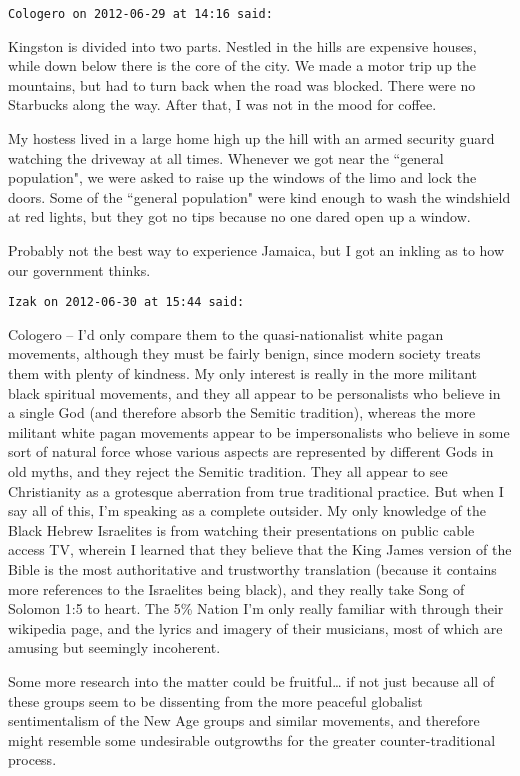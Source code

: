 \begin{footnotesize}
\begin{sffamily}
\hfill

\texttt{Cologero on 2012-06-29 at 14:16 said: }

Kingston is divided into two parts. Nestled in the hills are expensive houses, while down below there is the core of the city. We made a motor trip up the mountains, but had to turn back when the road was blocked. There were no Starbucks along the way. After that, I was not in the mood for coffee.

My hostess lived in a large home high up the hill with an armed security guard watching the driveway at all times. Whenever we got near the ``general population", we were asked to raise up the windows of the limo and lock the doors. Some of the ``general population" were kind enough to wash the windshield at red lights, but they got no tips because no one dared open up a window.

Probably not the best way to experience Jamaica, but I got an inkling as to how our government thinks.


\hfill

\texttt{Izak on 2012-06-30 at 15:44 said: }

Cologero – I'd only compare them to the quasi-nationalist white pagan movements, although they must be fairly benign, since modern society treats them with plenty of kindness. My only interest is really in the more militant black spiritual movements, and they all appear to be personalists who believe in a single God (and therefore absorb the Semitic tradition), whereas the more militant white pagan movements appear to be impersonalists who believe in some sort of natural force whose various aspects are represented by different Gods in old myths, and they reject the Semitic tradition. They all appear to see Christianity as a grotesque aberration from true traditional practice. But when I say all of this, I'm speaking as a complete outsider. My only knowledge of the Black Hebrew Israelites is from watching their presentations on public cable access TV, wherein I learned that they believe that the King James version of the Bible is the most authoritative and trustworthy translation (because it contains more references to the Israelites being black), and they really take Song of Solomon 1:5 to heart. The 5\% Nation I'm only really familiar with through their wikipedia page, and the lyrics and imagery of their musicians, most of which are amusing but seemingly incoherent.

Some more research into the matter could be fruitful… if not just because all of these groups seem to be dissenting from the more peaceful globalist sentimentalism of the New Age groups and similar movements, and therefore might resemble some undesirable outgrowths for the greater counter-traditional process.



\end{sffamily}
\end{footnotesize}
